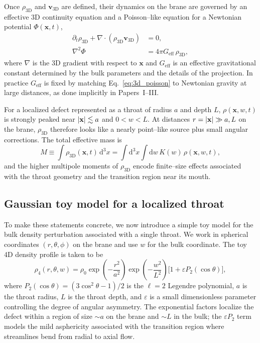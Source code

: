 \documentclass[12pt]{article}
\begin{document}
Once $\rho_{\mathrm{3D}}$ and $\mathbf{v}_{\mathrm{3D}}$ are defined, their
dynamics on the brane are governed by an effective 3D continuity equation
and a Poisson--like equation for a Newtonian potential $\Phi(\mathbf{x},t)$,
\begin{align}
  \partial_t \rho_{\mathrm{3D}}
  + \nabla \cdot (\rho_{\mathrm{3D}}\mathbf{v}_{\mathrm{3D}})
  &= 0,
  \label{eq:3d_continuity}
  \\
  \nabla^2 \Phi
  &= 4\pi G_{\mathrm{eff}}\,\rho_{\mathrm{3D}},
  \label{eq:3d_poisson}
\end{align}
where $\nabla$ is the 3D gradient with respect to $\mathbf{x}$ and
$G_{\mathrm{eff}}$ is an effective gravitational constant determined by the
bulk parameters and the details of the projection.
In practice $G_{\mathrm{eff}}$ is fixed by matching Eq.~\eqref{eq:3d_poisson}
to Newtonian gravity at large distances, as done implicitly in Papers~I--III.

For a localized defect represented as a throat of radius $a$ and depth $L$,
$\rho(\mathbf{x},w,t)$ is strongly peaked near $\abs{\mathbf{x}}\lesssim a$
and $0 < w < L$.  At distances $r=\abs{\mathbf{x}}\gg a,L$ on the brane,
$\rho_{\mathrm{3D}}$ therefore looks like a nearly point--like source plus
small angular corrections.  The total effective mass is
\begin{equation}
  M
  \equiv \int \rho_{\mathrm{3D}}(\mathbf{x},t)\,\mathrm{d}^3x
  = \int \mathrm{d}^3x\int \mathrm{d}w\,
      K(w)\,\rho(\mathbf{x},w,t),
\end{equation}
and the higher multipole moments of $\rho_{\mathrm{3D}}$ encode finite--size
effects associated with the throat geometry and the transition region near
its mouth.

\subsection{Gaussian toy model for a localized throat}
\label{subsec:gaussian_toy_model}

To make these statements concrete, we now introduce a simple toy model for
the bulk density perturbation associated with a single throat.  We work in
spherical coordinates $(r,\theta,\phi)$ on the brane and use $w$ for the
bulk coordinate.  The toy 4D density profile is taken to be
\begin{equation}
  \rho_4(r,\theta,w)
  = \rho_0
    \exp\!\left(-\frac{r^2}{a^2}\right)
    \exp\!\left(-\frac{w^2}{L^2}\right)
    \big[1 + \varepsilon P_2(\cos\theta)\big],
  \label{eq:rho4_gaussian}
\end{equation}
where $P_2(\cos\theta) = (3\cos^2\theta - 1)/2$ is the $\ell=2$ Legendre
polynomial, $a$ is the throat radius, $L$ is the throat depth, and
$\varepsilon$ is a small dimensionless parameter controlling the degree of
angular asymmetry.  The exponential factors localize the defect within a
region of size $\sim a$ on the brane and $\sim L$ in the bulk; the
$\varepsilon P_2$ term models the mild asphericity associated with the
transition region where streamlines bend from radial to axial flow.
\end{document}

